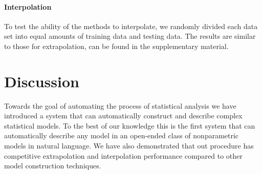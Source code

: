\documentclass[letterpaper]{article}
\newcommand{\procedurename}{ABCDE}
\begin{document}

\paragraph{Interpolation}
To test the ability of the methods to interpolate, we randomly divided each data set into equal amounts of training data and testing data.
The results are similar to those for extrapolation, can be found in the supplementary material.





\section{Discussion}

Towards the goal of automating the process of statistical analysis we have introduced a system that can automatically construct and describe complex statistical models.
To the best of our knowledge this is the first system that can automatically describe any model in an open-ended class of nonparametric models in natural language.
We have also demonstrated that out procedure has competitive extrapolation and interpolation performance compared to other model construction techniques.


\end{document}
